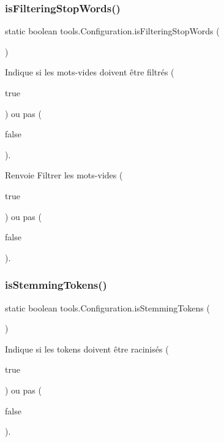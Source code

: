\subsubsection{\texorpdfstring{is\+Filtering\+Stop\+Words()}{isFilteringStopWords()}}
{\footnotesize\ttfamily static boolean tools.\+Configuration.\+is\+Filtering\+Stop\+Words (\begin{DoxyParamCaption}{ }\end{DoxyParamCaption})\hspace{0.3cm}{\ttfamily [static]}}

Indique si les mots-\/vides doivent être filtrés (
\begin{DoxyCode}
\textcolor{keyword}{true} 
\end{DoxyCode}
 ) ou pas (
\begin{DoxyCode}
\textcolor{keyword}{false} 
\end{DoxyCode}
 ).

\begin{DoxyReturn}{Renvoie}
Filtrer les mots-\/vides (
\begin{DoxyCode}
\textcolor{keyword}{true} 
\end{DoxyCode}
 ) ou pas (
\begin{DoxyCode}
\textcolor{keyword}{false} 
\end{DoxyCode}
 ). 
\end{DoxyReturn}
\mbox{\label{classtools_1_1Configuration_a13b2348432050da67f4bf348972b9420}} 
\subsubsection{\texorpdfstring{is\+Stemming\+Tokens()}{isStemmingTokens()}}
{\footnotesize\ttfamily static boolean tools.\+Configuration.\+is\+Stemming\+Tokens (\begin{DoxyParamCaption}{ }\end{DoxyParamCaption})\hspace{0.3cm}{\ttfamily [static]}}

Indique si les tokens doivent être racinisés (
\begin{DoxyCode}
\textcolor{keyword}{true} 
\end{DoxyCode}
 ) ou pas (
\begin{DoxyCode}
\textcolor{keyword}{false} 
\end{DoxyCode}
 ).


